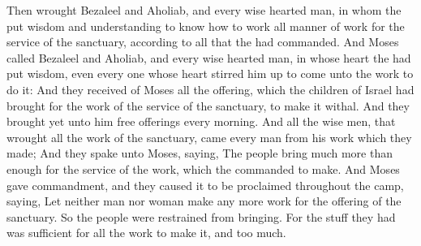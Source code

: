 \begin{biblechapter} %
\verse Then wrought Bezaleel and Aholiab, and every wise hearted man, in whom the \LORD put wisdom and understanding to know how to work all manner of work for the service of the sanctuary, according to all that the \LORD had commanded.
\verse And Moses called Bezaleel and Aholiab, and every wise hearted man, in whose heart the \LORD had put wisdom, even every one whose heart stirred him up to come unto the work to do it:
\verse And they received of Moses all the offering, which the children of Israel had brought for the work of the service of the sanctuary, to make it withal. And they brought yet unto him free offerings every morning.
\verse And all the wise men, that wrought all the work of the sanctuary, came every man from his work which they made;
\verse And they spake unto Moses, saying, The people bring much more than enough for the service of the work, which the \LORD commanded to make.
\verse And Moses gave commandment, and they caused it to be proclaimed throughout the camp, saying, Let neither man nor woman make any more work for the offering of the sanctuary. So the people were restrained from bringing.
\verse For the stuff they had was sufficient for all the work to make it, and too much.

\end{biblechapter}
